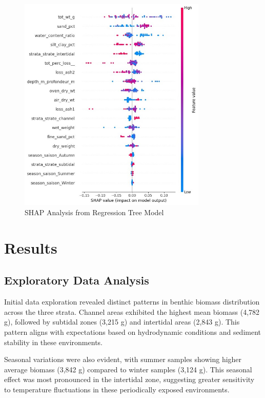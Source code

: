 \documentclass[12pt]{article}
\begin{document}
\begin{figure}[h!]
\centering
\includegraphics[width=0.8\textwidth]{SHAP-analysis-from-regression-tree.jpg}
\caption{SHAP Analysis from Regression Tree Model}
\label{fig:shap-analysis}
\end{figure}


\newpage
\section{Results}
\subsection{Exploratory Data Analysis}

\qquad Initial data exploration revealed distinct patterns in benthic biomass distribution across the three strata. Channel areas exhibited the highest mean biomass (4,782 g), followed by subtidal zones (3,215 g) and intertidal areas (2,843 g). This pattern aligns with expectations based on hydrodynamic conditions and sediment stability in these environments.

\qquad Seasonal variations were also evident, with summer samples showing higher average biomass (3,842 g) compared to winter samples (3,124 g). This seasonal effect was most pronounced in the intertidal zone, suggesting greater sensitivity to temperature fluctuations in these periodically exposed environments.
\end{document}

